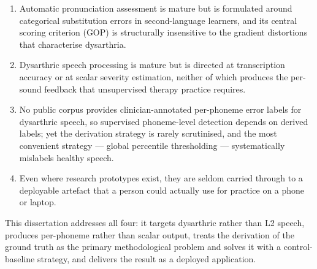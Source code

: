 \begin{enumerate}[leftmargin=*]
  \item Automatic pronunciation assessment is mature but is formulated around
        categorical substitution errors in second-language learners, and its
        central scoring criterion (GOP) is structurally insensitive to the
        gradient distortions that characterise dysarthria.
  \item Dysarthric speech processing is mature but is directed at transcription
        accuracy or at scalar severity estimation, neither of which produces
        the per-sound feedback that unsupervised therapy practice requires.
  \item No public corpus provides clinician-annotated per-phoneme error labels
        for dysarthric speech, so supervised phoneme-level detection depends on
        derived labels; yet the derivation strategy is rarely scrutinised, and
        the most convenient strategy --- global percentile thresholding ---
        systematically mislabels healthy speech.
  \item Even where research prototypes exist, they are seldom carried through
        to a deployable artefact that a person could actually use for practice
        on a phone or laptop.
\end{enumerate}

This dissertation addresses all four: it targets dysarthric rather than L2
speech, produces per-phoneme rather than scalar output, treats the derivation
of the ground truth as the primary methodological problem and solves it with a
control-baseline strategy, and delivers the result as a deployed application.
